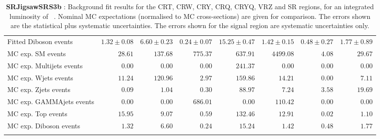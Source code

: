 \begin{table}
\begin{center}
{\begin{tabular*}{\textwidth}{@{\extracolsep{\fill}}lrrrrrrr}
        Fitted Diboson events         & $1.32 \pm 0.08$          & $6.60 \pm 0.23$          & $0.24 \pm 0.07$          & $15.25 \pm 0.47$          & $1.42 \pm 0.15$          & $0.48 \pm 0.27$          & $1.77 \pm 0.89$              \\
 \noalign{\smallskip}\hline\noalign{\smallskip}
MC exp. SM events              & $28.61$          & $137.68$          & $775.37$          & $637.91$          & $4499.08$          & $4.08$          & $29.67$              \\
\noalign{\smallskip}\hline\noalign{\smallskip}
        MC exp. Multijets events         & $0.00$          & $0.00$          & $0.00$          & $241.37$          & $0.00$          & $0.00$          & $0.00$              \\
        MC exp. Wjets events         & $11.24$          & $120.96$          & $2.97$          & $159.86$          & $14.21$          & $0.00$          & $7.11$              \\
        MC exp. Zjets events         & $0.09$          & $1.04$          & $0.30$          & $88.97$          & $7.24$          & $3.58$          & $19.69$              \\
        MC exp. GAMMAjets events         & $0.00$          & $0.00$          & $686.01$          & $0.00$          & $110.42$          & $0.00$          & $0.00$              \\
        MC exp. Top events         & $15.95$          & $9.07$          & $0.59$          & $132.46$          & $12.91$          & $0.02$          & $1.10$              \\
        MC exp. Diboson events         & $1.32$          & $6.60$          & $0.24$          & $15.24$          & $1.42$          & $0.48$          & $1.77$              \\
\noalign{\smallskip}\hline\noalign{\smallskip}
\end{tabular*}
}
\end{center}
\caption{{\bf SRJigsawSRS3b} : Background fit results for the CRT, CRW, CRY, CRQ, CRYQ, VRZ and SR regions, for an integrated luminosity of \ourintlumi~\ifb. Nominal MC expectations (normalised to MC cross-sections) are given for comparison. The errors shown are the statistical plus systematic uncertainties. The errors shown for the signal region are systematic uncertainties only.}
\label{table.results.systematics.in.logL.fit.CRT.CRW.CRY.CRQ.CRYQ.VRZ.SR.SRJigsawSRS3b}
\end{table}
%
